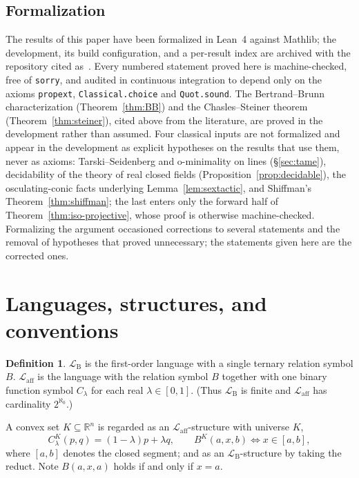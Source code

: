 \documentclass[11pt]{amsart}
\theoremstyle{definition}
\newtheorem{definition}[theorem]{Definition}
\newcommand{\R}{\mathbb{R}}
\newcommand{\Laff}{\mathcal{L}_{\mathrm{aff}}}
\newcommand{\LB}{\mathcal{L}_{\mathrm{B}}}
\begin{document}
\subsection*{Formalization}
The results of this paper have been formalized in Lean~4 against Mathlib; the
development, its build configuration, and a per-result index are archived with
the repository cited as~\cite{Repo}. Every numbered statement proved here is
machine-checked, free of \texttt{sorry}, and audited in continuous integration
to depend only on the axioms \texttt{propext}, \texttt{Classical.choice} and
\texttt{Quot.sound}. The Bertrand--Brunn characterization
(Theorem~\ref{thm:BB}) and the Chasles--Steiner theorem
(Theorem~\ref{thm:steiner}), cited above from the literature, are proved in the
development rather than assumed. Four classical inputs are not formalized and
appear in the development as explicit hypotheses on the results that use them,
never as axioms: Tarski--Seidenberg and o-minimality on lines
(\S\ref{sec:tame}), decidability of the theory of real closed fields
(Proposition~\ref{prop:decidable}), the osculating-conic facts underlying
Lemma~\ref{lem:sextactic}, and Shiffman's Theorem~\ref{thm:shiffman}; the last
enters only the forward half of Theorem~\ref{thm:iso-projective}, whose proof is
otherwise machine-checked. Formalizing the argument occasioned corrections to
several statements and the removal of hypotheses that proved unnecessary; the
statements given here are the corrected ones.

\section{Languages, structures, and conventions}\label{sec:languages}

\begin{definition}\label{def:languages}
$\LB$ is the first-order language with a single ternary relation symbol $B$.
$\Laff$ is the language with the relation symbol $B$ together with one binary
function symbol $C_\lambda$ for each real $\lambda\in[0,1]$. (Thus $\LB$ is
finite and $\Laff$ has cardinality $2^{\aleph_0}$.)

A convex set $K\subseteq\R^n$ is regarded as an $\Laff$-structure with
universe $K$,
\[
C_\lambda^K(p,q)=(1-\lambda)p+\lambda q,
\qquad
B^K(a,x,b)\iff x\in[a,b],
\]
where $[a,b]$ denotes the closed segment; and as an $\LB$-structure by taking
the reduct. Note $B(a,x,a)$ holds if and only if $x=a$.
\end{definition}
\end{document}
